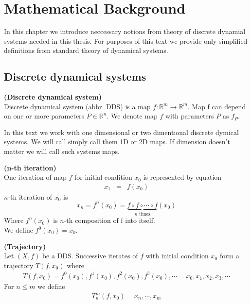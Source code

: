 \chapter{Mathematical Background}
In this chapter we introduce neccessary notions from theory of discrete dynamial systems needed in this thesis.
For purposes of this text we provide only simplified definitions from standard theory of dynamical systems.

\section{Discrete dynamical systems}

\begin{definition} \textbf{(Discrete dynamical system)} \\
    Discrete dynamical system (abbr. DDS) is a map $f: \mathbb{R}^{m} \rightarrow \mathbb{R}^{m}$.
    Map f can depend on one or more parameters $P \in \mathbb{R}^n$.
    We denote map $f$ with parameters $P$ as $f_P$.
\end{definition}

\begin{remark}
    In this text we work with one dimensional or two dimentional discrete dymical systems.
    We will call simply call them 1D or 2D maps.
    If dimension doesn't matter we will call such systems maps.
\end{remark}

\begin{definition} \textbf{(n-th iteration)} \\
    One iteration of map $f$ for initial condition $x_0$ is represented by equation
    \begin{eqnarray}
        x_{1}  & = & f(x_{0})
    \end{eqnarray}
    $n$-th iteration of $x_0$ is
    \begin{equation}
        x_{n} = f^{n}(x_0) = \underbrace{f \circ f \circ \cdots \circ f}_\text{$n$ times}(x_0)
    \end{equation}
    Where $f^{n}(x_0)$ is $n$-th composition of f into itself. \\
    We define $f^{0}(x_0) = x_0$.
\end{definition}

\begin{definition} \textbf{(Trajectory)} \\
    Let $(X, f)$ be a DDS. 
    Successive iterates of $f$ with initial condition $x_0$ form a trajectory $T(f, x_0)$ where
    \begin{eqnarray}
        T(f, x_0) = f^0(x_0), f^1(x_0), f^2(x_0), f^3(x_0), \cdots  = x_0, x_1, x_2, x_3, \cdots
    \end{eqnarray}
    For $n \leq m$ we define
    \begin{eqnarray}
        T_{n}^{m}(f, x_0) = x_n, \cdots, x_m
    \end{eqnarray}
\end{definition}

